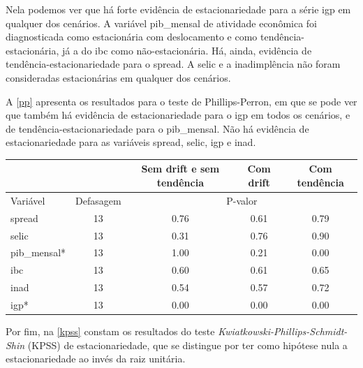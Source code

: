 \documentclass[a4paper,
               article,
               12pt,
               openany,
               oneside,
               english,
               brazil]{abntex2}
\numberwithin{equation}{section}
\begin{document}
    Nela podemos ver que há forte evidência de estacionariedade para a série igp em qualquer dos cenários. A variável pib\_mensal de atividade econômica foi diagnosticada como estacionária com deslocamento e como tendência-estacionária, já a do ibc como não-estacionária. Há, ainda, evidência de tendência-estacionariedade para o spread. A selic e a inadimplência não foram consideradas estacionárias em qualquer dos cenários.

    A \autoref{pp} apresenta os resultados para o teste de Phillips-Perron, em que se pode ver que também há evidência de estacionariedade para o igp em todos os cenários, e de tendência-estacionariedade para o pib\_mensal. Não há evidência de estacionariedade para as variáveis spread, selic, igp e inad. 

    \begin{table}[ht]
        {%
            \begin{tabular}{lcccc}
                \midrule
                &           & \multicolumn{1}{C{3cm}}{Sem drift e sem tendência} & \multicolumn{1}{C{3cm}}{Com drift} & \multicolumn{1}{C{3cm}}{Com tendência} \\
                \midrule
                Variável & Defasagem & \multicolumn{3}{c}{P-valor} \\
                \midrule
                spread     &         13 &     0.76 &     0.61 &     0.79 \\
                selic      &         13 &     0.31 &     0.76 &     0.90 \\
                pib\_mensal* &         13 &     1.00 &     0.21 &     0.00 \\
                ibc        &         13 &     0.60 &     0.61 &     0.65 \\
                inad       &         13 &     0.54 &     0.57 &     0.72 \\
                igp*        &         13 &     0.00 &     0.00 &     0.00 \\
                \midrule
            \end{tabular}
            } 
            {}
    \end{table}

    Por fim, na \autoref{kpss} constam os resultados do teste \textit{Kwiatkowski-Phillips-Schmidt-Shin} (KPSS) de estacionariedade, que se distingue por ter como hipótese nula a estacionariedade ao invés da raiz unitária.
\end{document}
